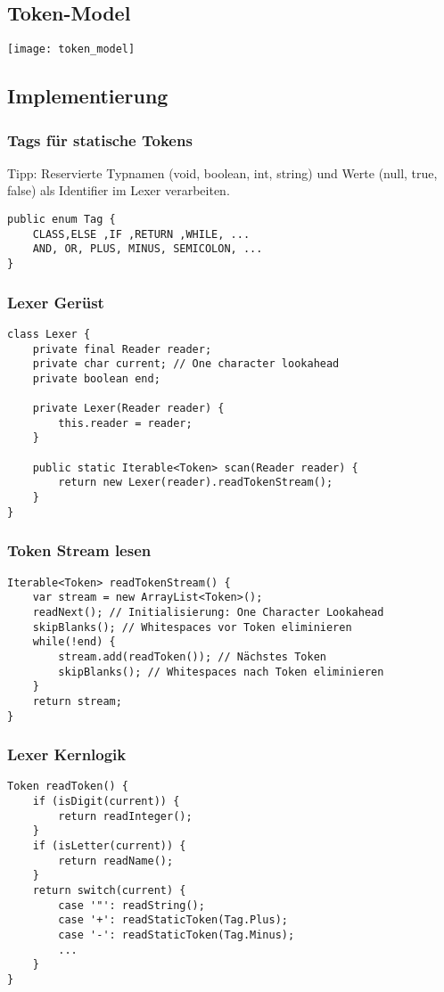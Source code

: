 \subsection{Token-Model}
\texttt{[image: token\_model]}

\subsection{Implementierung}
\subsubsection{Tags für statische Tokens}
Tipp: Reservierte Typnamen (void, boolean, int, string) und Werte (null, true, false) als Identifier im Lexer verarbeiten.
\begin{lstlisting}
public enum Tag {
    CLASS,ELSE ,IF ,RETURN ,WHILE, ...
    AND, OR, PLUS, MINUS, SEMICOLON, ...
}
\end{lstlisting}

\subsubsection{Lexer Gerüst}
\begin{lstlisting}
class Lexer {
    private final Reader reader;
    private char current; // One character lookahead
    private boolean end;

    private Lexer(Reader reader) {
        this.reader = reader;
    }

    public static Iterable<Token> scan(Reader reader) {
        return new Lexer(reader).readTokenStream();
    }
}
\end{lstlisting}

\subsubsection{Token Stream lesen}
\begin{lstlisting}
Iterable<Token> readTokenStream() {
    var stream = new ArrayList<Token>();
    readNext(); // Initialisierung: One Character Lookahead
    skipBlanks(); // Whitespaces vor Token eliminieren
    while(!end) {
        stream.add(readToken()); // Nächstes Token
        skipBlanks(); // Whitespaces nach Token eliminieren
    }
    return stream;
}
\end{lstlisting}

\subsubsection{Lexer Kernlogik}
\begin{lstlisting}
Token readToken() {
    if (isDigit(current)) {
        return readInteger();
    }
    if (isLetter(current)) {
        return readName();
    }
    return switch(current) {
        case '"': readString();
        case '+': readStaticToken(Tag.Plus);
        case '-': readStaticToken(Tag.Minus);
        ...
    }
}
\end{lstlisting}